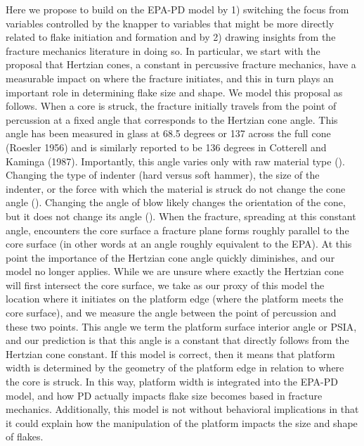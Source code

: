 \documentclass[10pt,letterpaper]{article}
\begin{document}
Here we propose to build on the EPA-PD model by 1) switching the focus
from variables controlled by the knapper to variables that might be more
directly related to flake initiation and formation and by 2) drawing
insights from the fracture mechanics literature in doing so. In
particular, we start with the proposal that Hertzian cones, a constant
in percussive fracture mechanics, have a measurable impact on where the
fracture initiates, and this in turn plays an important role in
determining flake size and shape. We model this proposal as follows.
When a core is struck, the fracture initially travels from the point of
percussion at a fixed angle that corresponds to the Hertzian cone angle.
This angle has been measured in glass at 68.5 degrees or 137 across the
full cone (Roesler 1956) and is similarly reported to be 136 degrees in
Cotterell and Kaminga (1987). Importantly, this angle varies only with
raw material type (). Changing the type of indenter (hard versus soft
hammer), the size of the indenter, or the force with which the material
is struck do not change the cone angle (). Changing the angle of blow
likely changes the orientation of the cone, but it does not change its
angle (). When the fracture, spreading at this constant angle,
encounters the core surface a fracture plane forms roughly parallel to
the core surface (in other words at an angle roughly equivalent to the
EPA). At this point the importance of the Hertzian cone angle quickly
diminishes, and our model no longer applies. While we are unsure where
exactly the Hertzian cone will first intersect the core surface, we take
as our proxy of this model the location where it initiates on the
platform edge (where the platform meets the core surface), and we
measure the angle between the point of percussion and these two points.
This angle we term the platform surface interior angle or PSIA, and our
prediction is that this angle is a constant that directly follows from
the Hertzian cone constant. If this model is correct, then it means that
platform width is determined by the geometry of the platform edge in
relation to where the core is struck. In this way, platform width is
integrated into the EPA-PD model, and how PD actually impacts flake size
becomes based in fracture mechanics. Additionally, this model is not
without behavioral implications in that it could explain how the
manipulation of the platform impacts the size and shape of flakes.
\end{document}
